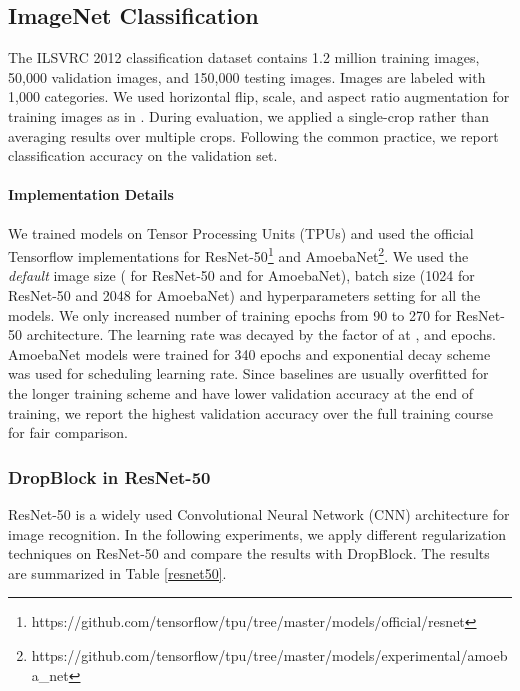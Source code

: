 \documentclass{article}
\begin{document}
\subsection{ImageNet Classification}
The ILSVRC 2012 classification dataset \cite{imagenet2009}
contains 1.2 million training images, 50,000 validation images, and 150,000 testing images. Images are labeled with 1,000 categories.
We used horizontal flip, scale, and aspect ratio augmentation for training images as in \cite{szegedy2015going, huang2017densely}. During evaluation, we applied a single-crop rather than averaging results over multiple crops. Following the common practice, we report classification accuracy on the validation set. 

\paragraph{Implementation Details}
We trained models on Tensor Processing Units (TPUs) and used the official Tensorflow implementations for  ResNet-50\footnote{https://github.com/tensorflow/tpu/tree/master/models/official/resnet}
and AmoebaNet\footnote{https://github.com/tensorflow/tpu/tree/master/models/experimental/amoeba\_net}. We used the \textit{default} image size ( for ResNet-50 and  for AmoebaNet), batch size (1024 for ResNet-50 and 2048 for AmoebaNet) and hyperparameters setting for all the models. We only increased number of training epochs from 90 to 270 for ResNet-50 architecture. The learning rate was decayed by the factor of  at ,   and  epochs.
AmoebaNet models were trained for 340 epochs and exponential decay scheme was used for scheduling learning rate.
Since baselines are usually overfitted for the longer training scheme and have lower
validation accuracy at the end of training, we report the
highest validation accuracy over the full training course for fair comparison.
\subsubsection{DropBlock in ResNet-50}

ResNet-50 \cite{he2016deep} is a widely used Convolutional
Neural Network (CNN) architecture for image recognition. In the following experiments, we apply different regularization techniques on ResNet-50 and compare the results with DropBlock. The results are summarized in Table \ref{resnet50}.
\end{document}
